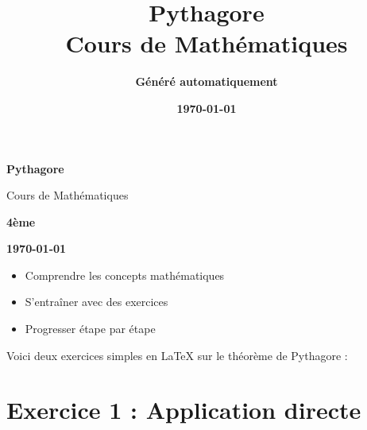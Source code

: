 \documentclass[12pt,a4paper]{article}
\title{\Huge\textcolor{primary}{\textbf{Pythagore}}\\[0.5cm]
\Large\textcolor{accent}{Cours de Mathématiques}}
\author{\Large\textcolor{secondary}{\textbf{Généré automatiquement}}}
\date{\Large\textcolor{warning}{\textbf{\today}}}
\begin{document}
\begin{titlepage}
\begin{center}
\vspace*{2cm}


\vspace{1cm}

{\Huge\textcolor{primary}{\textbf{Pythagore}}}

\vspace{0.5cm}

{\Large\textcolor{accent}{Cours de Mathématiques}}

\vspace{1cm}

{\Large\textcolor{secondary}{\textbf{4ème}}}

\vspace{0.5cm}

{\large\textcolor{warning}{\textbf{\today}}}

\vspace{2cm}

\begin{tcolorbox}[colback=lightgray,colframe=success,title=\textbf{\textcolor{success}{Objectifs du cours}}]
\begin{itemize}
\item Comprendre les concepts mathématiques
\item S'entraîner avec des exercices
\item Progresser étape par étape
\end{itemize}
\end{tcolorbox}

\end{center}
\end{titlepage}

\tableofcontents
\newpage

Voici deux exercices simples en LaTeX sur le théorème de Pythagore :



\section*{Exercice 1 : Application directe}
\end{document}
